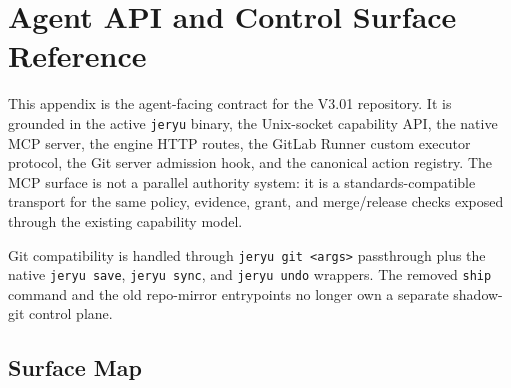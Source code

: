 \clearpage
\onecolumn
\raggedbottom
\section{Agent API and Control Surface Reference}
\label{app:agent-api}

\newcommand{\apicmd}[1]{\texttt{\footnotesize #1}}
\newcommand{\apicode}[1]{\texttt{\footnotesize #1}}
\newcommand{\apitabletitle}[1]{\par\medskip\begin{center}\small\textsc{#1}\end{center}\vspace{-0.7em}}
\setlength{\tabcolsep}{3pt}
\renewcommand{\arraystretch}{1.12}

This appendix is the agent-facing contract for the V3.01 repository. It is grounded in the active \apicode{jeryu} binary, the Unix-socket capability API, the native MCP server, the engine HTTP routes, the GitLab Runner custom executor protocol, the Git server admission hook, and the canonical action registry. The MCP surface is not a parallel authority system: it is a standards-compatible transport for the same policy, evidence, grant, and merge/release checks exposed through the existing capability model.

Git compatibility is handled through \apicode{jeryu git <args>} passthrough plus the native \apicode{jeryu save}, \apicode{jeryu sync}, and \apicode{jeryu undo} wrappers. The removed \apicode{ship} command and the old repo-mirror entrypoints no longer own a separate shadow-git control plane.

\subsection{Surface Map}

